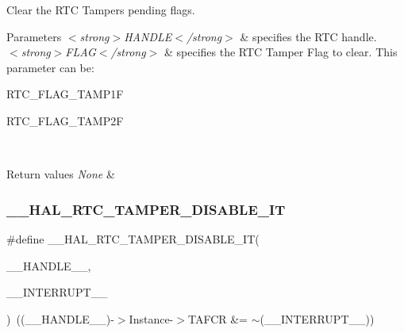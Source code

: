 Clear the R\+TC Tamper\textquotesingle{}s pending flags. 


\begin{DoxyParams}{Parameters}
{\em $<$strong$>$\+H\+A\+N\+D\+L\+E$<$/strong$>$} & specifies the R\+TC handle. \\
\hline
{\em $<$strong$>$\+F\+L\+A\+G$<$/strong$>$} & specifies the R\+TC Tamper Flag to clear. This parameter can be\+: \begin{DoxyItemize}
\item R\+T\+C\+\_\+\+F\+L\+A\+G\+\_\+\+T\+A\+M\+P1F \item R\+T\+C\+\_\+\+F\+L\+A\+G\+\_\+\+T\+A\+M\+P2F \end{DoxyItemize}
\\
\hline
\end{DoxyParams}

\begin{DoxyRetVals}{Return values}
{\em None} & \\
\hline
\end{DoxyRetVals}
\mbox{\label{group___r_t_c_ex___tamper_ga669a86ef4feb560e2059bf8cfe4fa253}} 
\subsubsection{\texorpdfstring{\+\_\+\+\_\+\+H\+A\+L\+\_\+\+R\+T\+C\+\_\+\+T\+A\+M\+P\+E\+R\+\_\+\+D\+I\+S\+A\+B\+L\+E\+\_\+\+IT}{\_\_HAL\_RTC\_TAMPER\_DISABLE\_IT}}
{\footnotesize\ttfamily \#define \+\_\+\+\_\+\+H\+A\+L\+\_\+\+R\+T\+C\+\_\+\+T\+A\+M\+P\+E\+R\+\_\+\+D\+I\+S\+A\+B\+L\+E\+\_\+\+IT(\begin{DoxyParamCaption}\item[{}]{\+\_\+\+\_\+\+H\+A\+N\+D\+L\+E\+\_\+\+\_\+,  }\item[{}]{\+\_\+\+\_\+\+I\+N\+T\+E\+R\+R\+U\+P\+T\+\_\+\+\_\+ }\end{DoxyParamCaption})~((\+\_\+\+\_\+\+H\+A\+N\+D\+L\+E\+\_\+\+\_\+)-\/$>$Instance-\/$>$T\+A\+F\+CR \&= $\sim$(\+\_\+\+\_\+\+I\+N\+T\+E\+R\+R\+U\+P\+T\+\_\+\+\_\+))}



